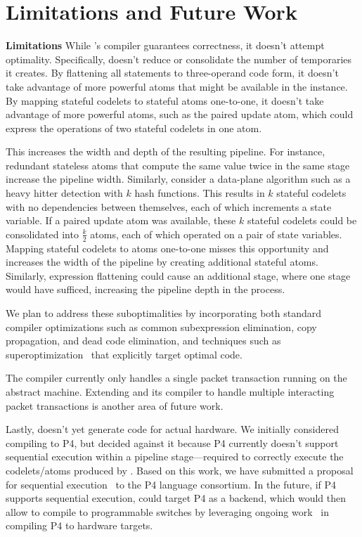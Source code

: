 \section{Limitations and Future Work}
\label{s:limitations}

\textbf{Limitations}
While \pktlanguage's compiler guarantees correctness, it doesn't attempt
optimality.  Specifically, \pktlanguage doesn't reduce or consolidate the
number of temporaries it creates. By flattening all statements to three-operand
code form, it doesn't take advantage of more powerful atoms that might be
available in the \absmachine instance. By mapping stateful codelets to stateful
atoms one-to-one, it doesn't take advantage of more powerful atoms, such as the
paired update atom, which could express the operations of two stateful codelets
in one atom.

This increases the width and depth of the resulting pipeline. For instance,
redundant stateless atoms that compute the same value twice in the same stage increase
the pipeline width. Similarly, consider a data-plane algorithm such as a heavy
hitter detection with $k$ hash functions. This results in $k$ stateful codelets
with no dependencies between themselves, each of which increments a state
variable. If a paired update atom was available, these $k$ stateful codelets
could be consolidated into $\frac{k}{2}$ atoms, each of which operated on a
pair of state variables. Mapping stateful codelets to atoms one-to-one misses
this opportunity and increases the width of the pipeline by creating additional
stateful atoms. Similarly, expression flattening could cause an additional stage,
where one stage would have sufficed, increasing the pipeline depth in the process.

We plan to address these suboptimalities by incorporating both standard
compiler optimizations such as common subexpression elimination, copy
propagation, and dead code elimination, and techniques such as
superoptimization~\cite{stoke, superoptimizer} that explicitly target optimal
code.

The \pktlanguage compiler currently only handles a single packet transaction
running on the abstract machine.  Extending \pktlanguage and its compiler to
handle multiple interacting packet transactions is another area of future work.

Lastly, \pktlanguage doesn't yet generate code for actual hardware. We
initially considered compiling \pktlanguage to P4, but decided against it
because P4 currently doesn't support sequential execution within a
pipeline stage---required to correctly execute the codelets/atoms produced by
\pktlanguage. Based on this work, we have submitted a proposal for sequential
execution~\cite{p4-semantics} to the P4 language consortium. In the future, if
P4 supports sequential execution, \pktlanguage could target P4 as a backend,
which would then allow \pktlanguage to compile to programmable switches by
leveraging ongoing work~\cite{netronome, xilinx,lavanya_compiler} in compiling
P4 to hardware targets.

